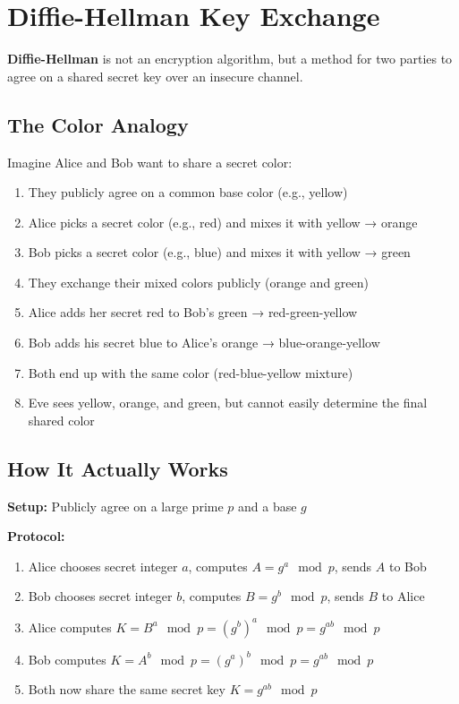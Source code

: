 \documentclass[11pt,a4paper]{report}
\begin{document}
\section{Diffie-Hellman Key Exchange}

\textbf{Diffie-Hellman} is not an encryption algorithm, but a method for two parties to agree on a shared secret key over an insecure channel.

\subsection{The Color Analogy}

Imagine Alice and Bob want to share a secret color:

\begin{enumerate}
\item They publicly agree on a common base color (e.g., yellow)
\item Alice picks a secret color (e.g., red) and mixes it with yellow → orange
\item Bob picks a secret color (e.g., blue) and mixes it with yellow → green
\item They exchange their mixed colors publicly (orange and green)
\item Alice adds her secret red to Bob's green → red-green-yellow
\item Bob adds his secret blue to Alice's orange → blue-orange-yellow
\item Both end up with the same color (red-blue-yellow mixture)
\item Eve sees yellow, orange, and green, but cannot easily determine the final shared color
\end{enumerate}

\subsection{How It Actually Works}

\textbf{Setup:} Publicly agree on a large prime $p$ and a base $g$

\textbf{Protocol:}
\begin{enumerate}
\item Alice chooses secret integer $a$, computes $A = g^a \mod p$, sends $A$ to Bob
\item Bob chooses secret integer $b$, computes $B = g^b \mod p$, sends $B$ to Alice
\item Alice computes $K = B^a \mod p = (g^b)^a \mod p = g^{ab} \mod p$
\item Bob computes $K = A^b \mod p = (g^a)^b \mod p = g^{ab} \mod p$
\item Both now share the same secret key $K = g^{ab} \mod p$
\end{enumerate}
\end{document}
